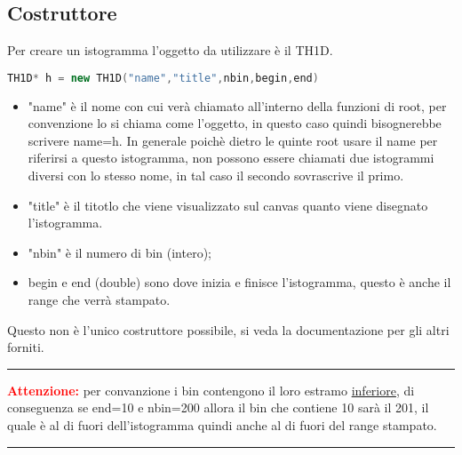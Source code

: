 \subsection{Costruttore}
Per creare un istogramma l'oggetto da utilizzare è il TH1D.
\begin{lstlisting}[language=C++,caption={Costruttore più comune per il TH1D},label={cod1},mathescape=true,breaklines=true]
	TH1D* h = new TH1D("name","title",nbin,begin,end)
\end{lstlisting}
\begin{itemize}
	\item "name" è il nome con cui verà chiamato all'interno della funzioni di root, per convenzione lo si chiama come l'oggetto, in questo caso quindi bisognerebbe scrivere name=h. In generale poichè dietro le quinte root usare il name per riferirsi a questo istogramma, non possono essere chiamati due istogrammi diversi con lo stesso nome, in tal caso il secondo sovrascrive il primo.
	\item "title" è il titotlo che viene visualizzato sul canvas quanto viene disegnato l'istogramma.
	\item "nbin" è il numero di bin (intero);
	\item begin e end (double) sono dove inizia e finisce l'istogramma, questo è anche il range che verrà stampato.
\end{itemize}
Questo non è l'unico costruttore possibile, si veda la documentazione per gli altri forniti.\\
{\color{red} \rule{\linewidth}{0.5mm}}
\textcolor{red}{\textbf{Attenzione:}} per convanzione i bin contengono il loro estramo \underline{inferiore}, di conseguenza se end=10 e nbin=200 allora il bin che contiene 10 sarà il 201, il quale è al di fuori dell'istogramma quindi anche al di fuori del range stampato.\\
{\color{red} \rule{\linewidth}{0.5mm}}


